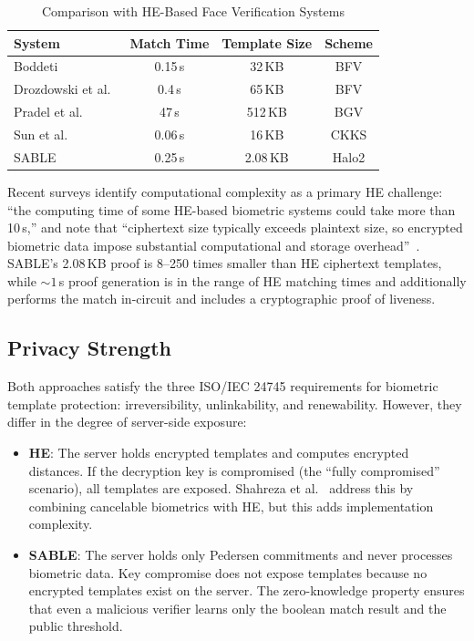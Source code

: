 \documentclass[conference]{IEEEtran}
\begin{document}
\begin{table}[t]
\centering
\caption{Comparison with HE-Based Face Verification Systems}
\label{tab:he-comparison}
\begin{tabular}{@{}lccc@{}}
\toprule
System & Match Time & Template Size & Scheme \\
\midrule
Boddeti~\cite{boddeti2018} & 0.15\,s & 32\,KB & BFV \\
Drozdowski et al.~\cite{drozdowski2019} & 0.4\,s & 65\,KB & BFV \\
Pradel et al.~\cite{pradel2021} & 47\,s & 512\,KB & BGV \\
Sun et al.~\cite{sun2022} & 0.06\,s & 16\,KB & CKKS \\
\midrule
SABLE & 0.25\,s & 2.08\,KB & Halo2 \\
\bottomrule
\end{tabular}
\end{table}

Recent surveys identify computational complexity as a primary HE challenge: ``the computing time of some HE-based biometric systems could take more than 10\,s,'' and note that ``ciphertext size typically exceeds plaintext size, so encrypted biometric data impose substantial computational and storage overhead''~\cite{yang2023}. SABLE's 2.08\,KB proof is 8--250 times smaller than HE ciphertext templates, while ${\sim}1$\,s proof generation is in the range of HE matching times and additionally performs the match in-circuit and includes a cryptographic proof of liveness.

\subsection{Privacy Strength}

Both approaches satisfy the three ISO/IEC 24745 requirements for biometric template protection: irreversibility, unlinkability, and renewability. However, they differ in the degree of server-side exposure:

\begin{itemize}
\item \textbf{HE}: The server holds encrypted templates and computes encrypted distances. If the decryption key is compromised (the ``fully compromised'' scenario), all templates are exposed. Shahreza et al.~\cite{shahreza2022} address this by combining cancelable biometrics with HE, but this adds implementation complexity.

\item \textbf{SABLE}: The server holds only Pedersen commitments and never processes biometric data. Key compromise does not expose templates because no encrypted templates exist on the server. The zero-knowledge property ensures that even a malicious verifier learns only the boolean match result and the public threshold.
\end{itemize}
\end{document}
